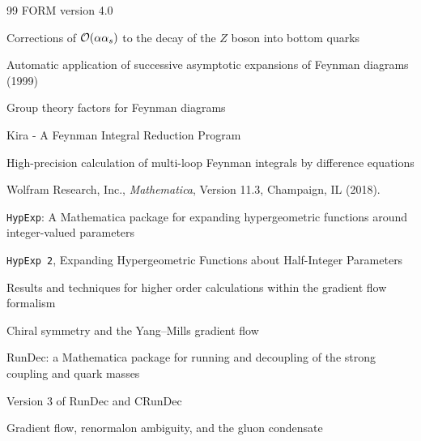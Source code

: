 \begin{thebibliography}{99}
  {FORM version 4.0}
  {}
  {}

  {Corrections of ${\cal O}(\alpha \alpha_s)$ to the decay of the $Z$ boson into bottom quarks}
  {}
  {}

  {Automatic application of successive asymptotic expansions of Feynman diagrams}
  {(1999)}
  {}

    {Group theory factors for Feynman diagrams}%
    {}%
    {}%

  {Kira - A Feynman Integral Reduction Program}
  {}
  {}

  {High-precision calculation of multi-loop Feynman integrals by difference equations}
  {}
  {}

Wolfram Research, Inc., \textit{Mathematica}, Version 11.3, Champaign,
IL (2018).

  {\texttt{HypExp}: A Mathematica package for expanding hypergeometric functions around integer-valued parameters}
  {}
  {}

  {\texttt{HypExp 2}, Expanding Hypergeometric Functions about Half-Integer Parameters}
  {}
  {}

  {Results and techniques for higher order calculations within the gradient flow formalism}
  {}
  {}

  {Chiral symmetry and the Yang--Mills gradient flow}
  {}
  {}

  {RunDec: a Mathematica package for running and decoupling of the
  strong coupling and quark masses}
  {}
  {}

  {Version 3 of RunDec and CRunDec}
  {}
  {}

  {Gradient flow, renormalon ambiguity, and the gluon condensate}
  {}
   {}

\end{thebibliography}
